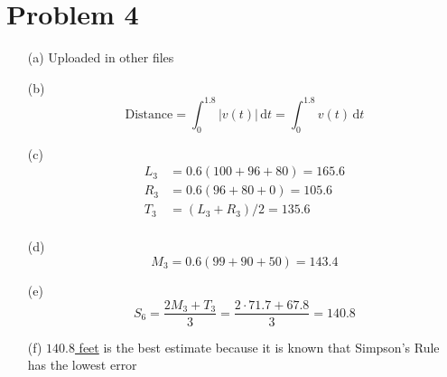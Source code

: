 \documentclass[preview, margin=0.6in]{standalone}
\newcommand*{\problem}[1]{\section*{Problem #1}}
\begin{document}
\problem{4}
\begin{itemize}
	\item[(a)] Uploaded in other files
	\item[(b)]
		\begin{equation*}
			\text{Distance}
			=\int_{0}^{1.8}|v(t)|\,\mathrm{d}t
			=\int_{0}^{1.8}v(t)\,\mathrm{d}t
		\end{equation*}
	\item[(c)]
		\begin{align*}
			L_3&=0.6(100+96+80)=165.6 \\
			R_3&=0.6(96+80+0)=105.6 \\
			T_3&=(L_3+R_3)/2=135.6 \\
		\end{align*}
	\item[(d)]
		\begin{equation*}
		    M_3=0.6(99+90+50)=143.4
		\end{equation*}
	\item[(e)]
		\begin{equation*}
			S_6=\frac{2M_3+T_3}{3}=\frac{2\cdot 71.7+67.8}{3}=140.8
		\end{equation*}
	\item[(f)] \underline{$140.8$ feet} is the best estimate because it is known that Simpson's Rule has the lowest error
\end{itemize}
\end{document}
